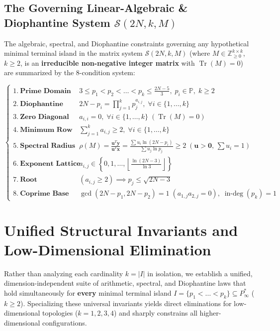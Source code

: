 \documentclass[11pt,a4paper]{article}
\theoremstyle{definition}
\begin{document}
\subsection*{The Governing Linear-Algebraic \& Diophantine System $\mathcal{S}(2N, k, M)$}

The algebraic, spectral, and Diophantine constraints governing any hypothetical minimal terminal island in the matrix system $\mathcal{S}(2N, k, M)$ (where $M \in \mathbb{Z}_{\ge 0}^{k \times k}$, $k \ge 2$, is an \textbf{irreducible non-negative integer matrix} with $\operatorname{Tr}(M) = 0$) are summarized by the 8-condition system:

\begin{footnotesize}
\[
\begin{cases}
1.\ \textbf{Prime Domain Bounds:} & 3 \le p_1 < p_2 < \dots < p_k \le \frac{2N-5}{3}, \; p_i \in \mathbb{P}, \; k \ge 2 \\[4pt]
2.\ \textbf{Diophantine Factorization:} & 2N - p_i = \prod_{j=1}^k p_j^{a_{i,j}}, \; \forall i \in \{1, \dots, k\} \\[4pt]
3.\ \textbf{Zero Diagonal Identity:} & a_{i,i} = 0, \; \forall i \in \{1, \dots, k\} \; (\operatorname{Tr}(M) = 0) \\[4pt]
4.\ \textbf{Minimum Row Sum:} & \sum_{j=1}^k a_{i,j} \ge 2, \; \forall i \in \{1, \dots, k\} \\[4pt]
5.\ \textbf{Spectral Radius Bound:} & \rho(M) = \frac{\mathbf{u}^T \mathbf{y}}{\mathbf{u}^T \mathbf{x}} = \frac{\sum u_i \ln(2N - p_i)}{\sum u_j \ln p_j} \ge 2 \; (\mathbf{u} > \mathbf{0}, \, \sum u_i = 1) \\[4pt]
6.\ \textbf{Exponent Lattice Ceiling:} & a_{i,j} \in \left\{0, 1, \dots, \left\lfloor \frac{\ln(2N - 3)}{\ln 3} \right\rfloor \right\} \\[4pt]
7.\ \textbf{Root Compression:} & (a_{i,j} \ge 2) \implies p_j \le \sqrt{2N - 3} \\[4pt]
8.\ \textbf{Coprime Base \& Rigidity:} & \gcd(2N - p_1, 2N - p_2) = 1 \; (a_{1,j} a_{2,j} = 0), \; \operatorname{in-deg}(p_k) = 1
\end{cases}
\]
\end{footnotesize}

\section{Unified Structural Invariants and Low-Dimensional Elimination}
\label{sec:structural_elimination}

Rather than analyzing each cardinality $k = |I|$ in isolation, we establish a unified, dimension-independent suite of arithmetic, spectral, and Diophantine laws that hold simultaneously for \textbf{every} minimal terminal island $I = \{p_1 < \dots < p_k\} \subseteq P^*_\infty$ ($k \ge 2$). Specializing these universal invariants yields direct eliminations for low-dimensional topologies ($k = 1, 2, 3, 4$) and sharply constrains all higher-dimensional configurations.
\end{document}
